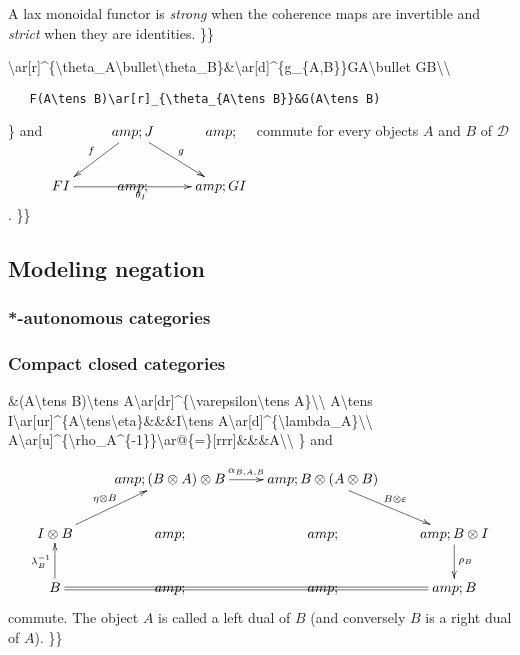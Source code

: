 A lax monoidal functor is \emph{strong} when the coherence maps are
invertible and \emph{strict} when they are identities. \}\}

\textbackslash{}ar{[}r{]}\^{}\{\textbackslash{}theta\_A\textbackslash{}bullet\textbackslash{}theta\_B\}\&\textbackslash{}ar{[}d{]}\^{}\{g\_\{A,B\}\}GA\textbackslash{}bullet
GB\textbackslash{}\textbackslash{}

\texttt{~~~F(A\textbackslash{}tens~B)\textbackslash{}ar{[}r{]}\_\{\textbackslash{}theta\_\{A\textbackslash{}tens~B\}\}\&G(A\textbackslash{}tens~B)}

\} and \(\xymatrix{
  &amp;\ar[dl]_{f}J\ar[dr]^{g}&amp;\\
  FI\ar[rr]_{\theta_I}&amp;&amp;GI
}\) commute for every objects \(A\) and \(B\) of \(\mathcal{D}\). \}\}

\subsection{Modeling negation}\label{modeling-negation}

\subsubsection{*-autonomous categories}\label{autonomous-categories}

\subsubsection{Compact closed
categories}\label{compact-closed-categories}

\&(A\textbackslash{}tens B)\textbackslash{}tens
A\textbackslash{}ar{[}dr{]}\^{}\{\textbackslash{}varepsilon\textbackslash{}tens
A\}\textbackslash{}\textbackslash{} A\textbackslash{}tens
I\textbackslash{}ar{[}ur{]}\^{}\{A\textbackslash{}tens\textbackslash{}eta\}\&\&\&I\textbackslash{}tens
A\textbackslash{}ar{[}d{]}\^{}\{\textbackslash{}lambda\_A\}\textbackslash{}\textbackslash{}
A\textbackslash{}ar{[}u{]}\^{}\{\textbackslash{}rho\_A\^{}\{-1\}\}\textbackslash{}ar@\{=\}{[}rrr{]}\&\&\&A\textbackslash{}\textbackslash{}
\} and

\[\xymatrix{
&amp;(B\tens A)\tens B\ar[r]^{\alpha_{B,A,B}}&amp;B\tens(A\tens B)\ar[dr]^{B\tens\varepsilon}\\
I\tens B\ar[ur]^{\eta\tens B}&amp;&amp;&amp;B\tens I\ar[d]^{\rho_B}\\
B\ar[u]^{\lambda_B^{-1}}\ar@{=}[rrr]&amp;&amp;&amp;B\\
}\] commute. The object \(A\) is called a left dual of \(B\) (and
conversely \(B\) is a right dual of \(A\)). \}\}

